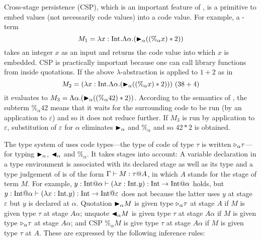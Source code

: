Cross-stage persistence (CSP), which is an important feature of \LTP,
is a primitive to embed values (not necessarily code values) into a
code value.  For example, a \LTP-term
\[
  M_1 = \lambda x:\textrm{Int}.\Lambda\alpha.({\mathop{\blacktriangleright}}_\alpha ((\%_\alpha x) * 2))
\]
takes an integer \(x\) as an input and returns the code value into
which \(x\) is embedded.  CSP is practically important because
one can call library functions from inside quotations.  If the above
\(\lambda\)-abstraction is applied to $1 + 2$ as in
\[
  M_2 = (\lambda x:\textrm{Int}.\Lambda\alpha.({\mathop{\blacktriangleright}}_\alpha ((\%_\alpha x) * 2)))\ (38 + 4)
\]
it evaluates to
\(M_3 = \Lambda\alpha.({\mathop{\blacktriangleright}}_\alpha ((\%_\alpha 42) * 2))\).  According
to the semantics of \LTP, the subterm $\%_\alpha 42$ means that it
waits for the surrounding code to be run (by an application to
$\varepsilon$) and so it does not reduce further.  If \(M_3\) is run
by application to \(\varepsilon\), substitution of \(\varepsilon\) for
\(\alpha\) eliminates \({\mathop{\blacktriangleright}}_\alpha\) and \(\%_\alpha\) and so
\(42 * 2\) is obtained.

The type system of \LTP uses code types---the type of code of type
\(\tau\) is written \({\mathop{\triangleright}}_\alpha \tau\)---for typing \({\mathop{\blacktriangleright}}_\alpha\),
\({\mathop{\blacktriangleleft}}_\alpha\) and \(\%_\alpha\).  It takes stages into account: A
variable declaration in a type environment is associated with its
declared stage as well as its type and a type judgement of \LTP is of
the form $\Gamma \vdash M : \tau @ A$, in which $A$ stands for the stage
of term $M$.  For example,
$y:\I@\alpha \vdash (\lambda x:\I.y) : \I \to \I @ \alpha$ holds, but
$y:\I@\alpha \vdash (\lambda x:\I.y) : \I \to \I @ \varepsilon$ does
not because the latter uses $y$ at stage \(\varepsilon\) but $y$ is
declared at $\alpha$.  Quotation \({\mathop{\blacktriangleright}}_\alpha M\) is given type
\({\mathop{\triangleright}}_\alpha \tau\) at stage \(A\) if \(M\) is given type \(\tau\) at
stage \(A\alpha\); unquote \({\mathop{\blacktriangleleft}}_\alpha M\) is given type \(\tau\)
at stage \(A\alpha\) if \(M\) is given type \({\mathop{\triangleright}}_\alpha \tau\) at
stage \(A\alpha\); and CSP \(\%_\alpha M\) is give type \(\tau\)
at stage \(A\alpha\) if \(M\) is given type \(\tau\) at \(A\).
These are expressed by the following inference rules:
\begin{center}
	 \hfil
	 \hfil
\end{center}

